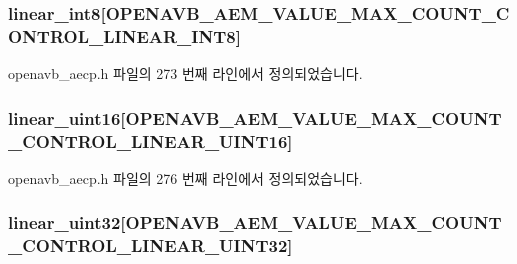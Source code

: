 \subsubsection[{\texorpdfstring{linear\+\_\+int8}{linear_int8}}]{ linear\+\_\+int8\mbox{[}{\bf O\+P\+E\+N\+A\+V\+B\+\_\+\+A\+E\+M\+\_\+\+V\+A\+L\+U\+E\+\_\+\+M\+A\+X\+\_\+\+C\+O\+U\+N\+T\+\_\+\+C\+O\+N\+T\+R\+O\+L\+\_\+\+L\+I\+N\+E\+A\+R\+\_\+\+I\+N\+T8}\mbox{]}}\hypertarget{structopenavb__aecp__response__data__get__control__t_a45419fbe4bd6ac07e20b168e97eef09c}{}\label{structopenavb__aecp__response__data__get__control__t_a45419fbe4bd6ac07e20b168e97eef09c}


openavb\+\_\+aecp.\+h 파일의 273 번째 라인에서 정의되었습니다.

\subsubsection[{\texorpdfstring{linear\+\_\+uint16}{linear_uint16}}]{ linear\+\_\+uint16\mbox{[}{\bf O\+P\+E\+N\+A\+V\+B\+\_\+\+A\+E\+M\+\_\+\+V\+A\+L\+U\+E\+\_\+\+M\+A\+X\+\_\+\+C\+O\+U\+N\+T\+\_\+\+C\+O\+N\+T\+R\+O\+L\+\_\+\+L\+I\+N\+E\+A\+R\+\_\+\+U\+I\+N\+T16}\mbox{]}}\hypertarget{structopenavb__aecp__response__data__get__control__t_afd0deb9ad36fea24f7188886e6899474}{}\label{structopenavb__aecp__response__data__get__control__t_afd0deb9ad36fea24f7188886e6899474}


openavb\+\_\+aecp.\+h 파일의 276 번째 라인에서 정의되었습니다.

\subsubsection[{\texorpdfstring{linear\+\_\+uint32}{linear_uint32}}]{ linear\+\_\+uint32\mbox{[}{\bf O\+P\+E\+N\+A\+V\+B\+\_\+\+A\+E\+M\+\_\+\+V\+A\+L\+U\+E\+\_\+\+M\+A\+X\+\_\+\+C\+O\+U\+N\+T\+\_\+\+C\+O\+N\+T\+R\+O\+L\+\_\+\+L\+I\+N\+E\+A\+R\+\_\+\+U\+I\+N\+T32}\mbox{]}}\hypertarget{structopenavb__aecp__response__data__get__control__t_a3505f0d5403a1f209788246b210d6422}{}\label{structopenavb__aecp__response__data__get__control__t_a3505f0d5403a1f209788246b210d6422}



